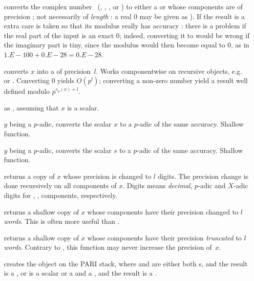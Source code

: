  converts the complex number~
(, , ,  or ) to either
a  or  whose components are  of precision
; not necessarily of \emph{length} : a real $0$ may be
given as ). If the result is a  extra care is
taken so that its modulus really has accuracy : there is a problem
if the real part of the input is an exact $0$; indeed, converting it to
 would be wrong if the imaginary part is tiny, since the
modulus would then become equal to $0$, as in $1.E-100 + 0.E-28 = 0.E-28$.

 converts $x$ into a 
of precision~$l$. Works componentwise on recursive objects,
e.g.~ or . Converting $0$ yields $O(p^l)$; converting a
non-zero number yield a result well defined modulo $p^{v_p(x) + l}$.

 as , assuming that $x$
is a scalar.

 $y$ being a $p$-adic, converts the scalar $x$
to a $p$-adic of the same accuracy. Shallow function.

 $y$ being a $p$-adic, converts the scalar $s$
to a $p$-adic of the same accuracy. Shallow function.

 returns a copy of $x$ whose precision is
changed to $l$ digits. The precision change is done recursively on all
components of $x$. Digits means \emph{decimal}, $p$-adic and $X$-adic digits
for , ,  components, respectively.

 returns a shallow copy of $x$ whose
 components have their precision changed to $l$ \emph{words}. This
is often more useful than .

 returns a shallow copy of $x$ whose
 components have their precision \emph{truncated} to $l$
\emph{words}. Contrary to , this function may never increase
the precision of~$x$.


 creates the object  on
the PARI stack, where  and  are either both s, and the
result is a , or  is a scalar or a  and  a
, and the result is a .

